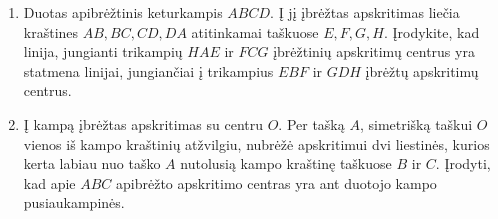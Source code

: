 \begin{enumerate}
  \item Duotas apibrėžtinis keturkampis $ABCD$. Į jį įbrėžtas
    apskritimas liečia kraštines $AB,BC,CD,DA$ atitinkamai
    taškuose $E,F,G,H$. Įrodykite, kad linija, jungianti
    trikampių $HAE$ ir $FCG$ įbrėžtinių apskritimų centrus yra
    statmena linijai, jungiančiai į trikampius $EBF$ ir $GDH$
    įbrėžtų apskritimų centrus.
  \item Į kampą įbrėžtas apskritimas su centru $O$. Per tašką
    $A$, simetrišką taškui $O$ vienos iš kampo kraštinių
    atžvilgiu, nubrėžė apskritimui dvi liestinės, kurios kerta
    labiau nuo taško $A$ nutolusią kampo kraštinę taškuose $B$
    ir $C$. Įrodyti, kad apie $ABC$ apibrėžto apskritimo
    centras yra ant duotojo kampo pusiaukampinės.

\end{enumerate}
